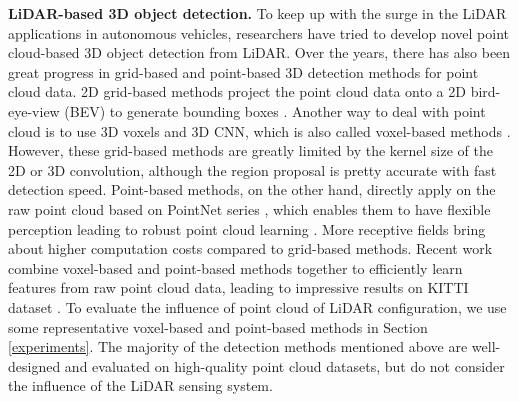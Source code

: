 \documentclass[10pt,twocolumn,letterpaper]{article}
\begin{document}
\textbf{LiDAR-based 3D object detection.} To keep up with the surge  in the LiDAR applications in autonomous vehicles, researchers have tried to develop novel point cloud-based 3D object detection from LiDAR. Over the years, there has also been great progress in grid-based and point-based 3D detection methods for point cloud data. 2D grid-based methods project the point cloud data onto a 2D bird-eye-view (BEV) to generate bounding boxes \cite{chen2017multi, liang2019multi, vora2020pointpainting, vora2020pointpainting, Yin_2021_CVPR, lang2019pointpillars}. Another way to deal with point cloud is to use 3D voxels and 3D CNN, which is also called voxel-based methods \cite{zhou2018voxelnet,  yan2018second, shi2020points, graham20183d, deng2020voxel}. However, these grid-based methods are greatly limited by the kernel size of the 2D or 3D convolution, although the region proposal is pretty accurate with fast detection speed. Point-based methods, on the other hand, directly apply on the raw point cloud based on PointNet series \cite{qi2017pointnet, qi2017pointnet++, qi2018frustum}, which enables them to have flexible perception leading to robust point cloud learning \cite{wang2019dynamic,yang2019std, qi2019deep, yang20203dssd}.  More receptive fields bring about higher computation costs compared to grid-based methods. Recent work  \cite{shi2020pv, shi2021pv} combine voxel-based and point-based methods together to efficiently learn features from raw point cloud data, leading to impressive results on KITTI dataset \cite{geiger2013vision}. To evaluate the influence of point cloud of LiDAR configuration, we use some representative voxel-based and point-based methods \cite{openpcdet2020} in Section \ref{experiments}. The majority of the detection methods mentioned above are well-designed and evaluated on high-quality point cloud datasets, but do not consider the influence of the LiDAR sensing system.


\end{document}
